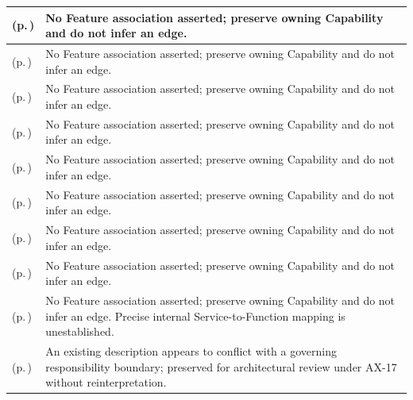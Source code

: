 \begin{longtable}{|>{\raggedright\arraybackslash}p{0.38\TableWidth}|>{\raggedright\arraybackslash}p{0.62\TableWidth}|}
\nameref{function:verify-operational-access-credential} (p.\,\pageref{function:verify-operational-access-credential}) & No Feature association asserted; preserve owning Capability and do not infer an edge.\\\hline
\nameref{service:operational-credential-checkpoint-service} (p.\,\pageref{service:operational-credential-checkpoint-service}) & No Feature association asserted; preserve owning Capability and do not infer an edge.\\\hline
\nameref{function:retrieve-health-information} (p.\,\pageref{function:retrieve-health-information}) & No Feature association asserted; preserve owning Capability and do not infer an edge.\\\hline
\nameref{service:clinical-resource-retrieval-service} (p.\,\pageref{service:clinical-resource-retrieval-service}) & No Feature association asserted; preserve owning Capability and do not infer an edge.\\\hline
\nameref{function:apply-access-qualified-result-filtering} (p.\,\pageref{function:apply-access-qualified-result-filtering}) & No Feature association asserted; preserve owning Capability and do not infer an edge.\\\hline
\nameref{function:evaluate-consent-constraint} (p.\,\pageref{function:evaluate-consent-constraint}) & No Feature association asserted; preserve owning Capability and do not infer an edge.\\\hline
\nameref{service:consent-enforcement-service} (p.\,\pageref{service:consent-enforcement-service}) & No Feature association asserted; preserve owning Capability and do not infer an edge.\\\hline
\nameref{function:propagate-security-context} (p.\,\pageref{function:propagate-security-context}) & No Feature association asserted; preserve owning Capability and do not infer an edge.\\\hline
\nameref{service:security-context-validation-service} (p.\,\pageref{service:security-context-validation-service}) & No Feature association asserted; preserve owning Capability and do not infer an edge. Precise internal Service-to-Function mapping is unestablished.\\\hline
\nameref{function:coordinate-care-team-collaboration} (p.\,\pageref{function:coordinate-care-team-collaboration}) & An existing description appears to conflict with a governing responsibility boundary; preserved for architectural review under AX-17 without reinterpretation.\\\hline

\end{longtable}
